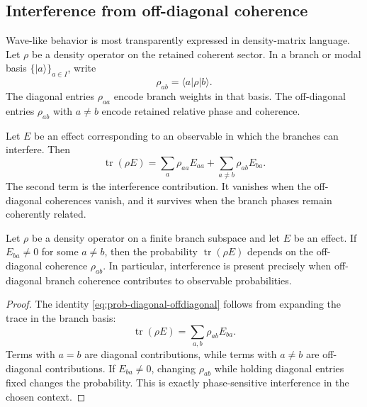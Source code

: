 \documentclass[11pt]{article}
\begin{document}
\subsection{Interference from off-diagonal coherence}
\label{subsec:interference-off-diagonal}

Wave-like behavior is most transparently expressed in density-matrix language. Let
\(\rho\) be a density operator on the retained coherent sector. In a branch or modal basis
\(\{|a\rangle\}_{a\in I}\), write
\begin{equation}
  \rho_{ab}
  =
  \langle a|\rho|b\rangle.
\end{equation}
The diagonal entries \(\rho_{aa}\) encode branch weights in that basis. The off-diagonal entries
\(\rho_{ab}\) with \(a\neq b\) encode retained relative phase and coherence.

Let \(E\) be an effect corresponding to an observable in which the branches can interfere.
Then
\begin{equation}
  \operatorname{tr}(\rho E)
  =
  \sum_a \rho_{aa}E_{aa}
  +
  \sum_{a\neq b}\rho_{ab}E_{ba}.
  \label{eq:prob-diagonal-offdiagonal}
\end{equation}
The second term is the interference contribution. It vanishes when the off-diagonal
coherences vanish, and it survives when the branch phases remain coherently related.

\begin{proposition}
\label{prop:interference-criterion}
Let \(\rho\) be a density operator on a finite branch subspace and let \(E\) be an effect.
If \(E_{ba}\neq0\) for some \(a\neq b\), then the probability \(\operatorname{tr}(\rho E)\)
depends on the off-diagonal coherence \(\rho_{ab}\). In particular, interference is present
precisely when off-diagonal branch coherence contributes to observable probabilities.
\end{proposition}

\begin{proof}
The identity \eqref{eq:prob-diagonal-offdiagonal} follows from expanding the trace in the
branch basis:
\begin{equation}
  \operatorname{tr}(\rho E)
  =
  \sum_{a,b}\rho_{ab}E_{ba}.
\end{equation}
Terms with \(a=b\) are diagonal contributions, while terms with \(a\neq b\) are off-diagonal
contributions. If \(E_{ba}\neq0\), changing \(\rho_{ab}\) while holding diagonal entries fixed
changes the probability. This is exactly phase-sensitive interference in the chosen context.
\end{proof}
\end{document}
